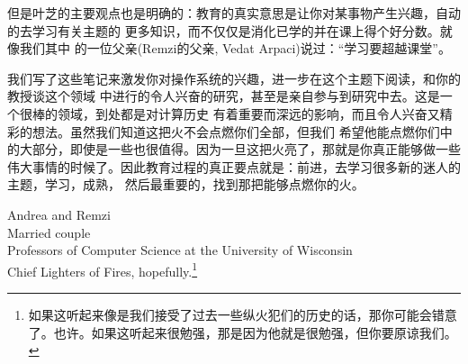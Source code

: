 但是叶芝的主要观点也是明确的：教育的真实意思是让你对某事物产生兴趣，自动的去学习有关主题的
更多知识，而不仅仅是消化已学的并在课上得个好分数。就像我们其中
的一位父亲(Remzi的父亲, Vedat Arpaci)说过：“学习要超越课堂”。

我们写了这些笔记来激发你对操作系统的兴趣，进一步在这个主题下阅读，和你的教授谈这个领域
中进行的令人兴奋的研究，甚至是亲自参与到研究中去。这是一个很棒的领域，到处都是对计算历史
有着重要而深远的影响，而且令人兴奋又精彩的想法。虽然我们知道这把火不会点燃你们全部，但我们
希望他能点燃你们中的大部分，即使是一些也很值得。因为一旦这把火亮了，那就是你真正能够做一些
伟大事情的时候了。因此教育过程的真正要点就是：前进，去学习很多新的迷人的主题，学习，成熟，
然后最重要的，找到那把能够点燃你的火。

\bigskip
\noindent Andrea and Remzi \\
Married couple \\
Professors of Computer Science at the University of Wisconsin \\
Chief Lighters of Fires, 
hopefully.\footnote{如果这听起来像是我们接受了过去一些纵火犯们的历史的话，那你可能会错意
	了。也许。如果这听起来很勉强，那是因为他就是很勉强，但你要原谅我们。}
\clearpage

\printbibliography[heading=subbibintoc,title={引用文献}]


